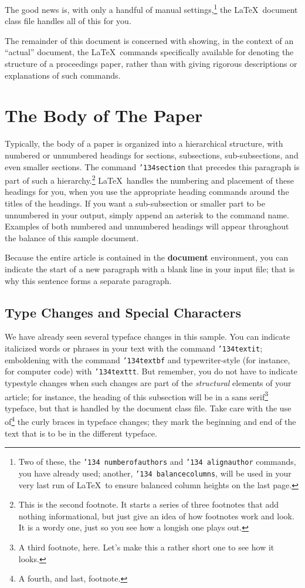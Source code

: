 \documentclass{nime-alternate}
\begin{document}
The good news is, with only a handful of manual
settings,\footnote{Two of these, the {\texttt{\char'134 numberofauthors}}
and {\texttt{\char'134 alignauthor}} commands, you have
already used; another, {\texttt{\char'134 balancecolumns}}, will
be used in your very last run of \LaTeX\ to ensure
balanced column heights on the last page.} the \LaTeX\ document
class file handles all of this for you.

The remainder of this document is concerned with showing, in
the context of an ``actual'' document, the \LaTeX\ commands
specifically available for denoting the structure of a
proceedings paper, rather than with giving rigorous descriptions
or explanations of such commands.

\section{The {\secit Body} of The Paper}
Typically, the body of a paper is organized
into a hierarchical structure, with numbered or unnumbered
headings for sections, subsections, sub-subsections, and even
smaller sections.  The command \texttt{{\char'134}section} that
precedes this paragraph is part of such a
hierarchy.\footnote{This is the second footnote.  It
starts a series of three footnotes that add nothing
informational, but just give an idea of how footnotes work
and look. It is a wordy one, just so you see
how a longish one plays out.} \LaTeX\ handles the numbering
and placement of these headings for you, when you use
the appropriate heading commands around the titles
of the headings.  If you want a sub-subsection or
smaller part to be unnumbered in your output, simply append an
asterisk to the command name.  Examples of both
numbered and unnumbered headings will appear throughout the
balance of this sample document.

Because the entire article is contained in
the \textbf{document} environment, you can indicate the
start of a new paragraph with a blank line in your
input file; that is why this sentence forms a separate paragraph.

\subsection{Type Changes and {\subsecit Special} Characters}
We have already seen several typeface changes in this sample.  You
can indicate italicized words or phrases in your text with
the command \texttt{{\char'134}textit}; emboldening with the
command \texttt{{\char'134}textbf}
and typewriter-style (for instance, for computer code) with
\texttt{{\char'134}texttt}.  But remember, you do not
have to indicate typestyle changes when such changes are
part of the \textit{structural} elements of your
article; for instance, the heading of this subsection will
be in a sans serif\footnote{A third footnote, here.
Let's make this a rather short one to
see how it looks.} typeface, but that is handled by the
document class file. Take care with the use
of\footnote{A fourth, and last, footnote.}
the curly braces in typeface changes; they mark
the beginning and end of
the text that is to be in the different typeface.
\end{document}
